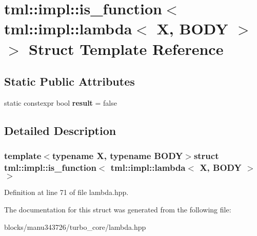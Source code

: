 \hypertarget{structtml_1_1impl_1_1is__function_3_01tml_1_1impl_1_1lambda_3_01_x_00_01_b_o_d_y_01_4_01_4}{\section{tml\+:\+:impl\+:\+:is\+\_\+function$<$ tml\+:\+:impl\+:\+:lambda$<$ X, B\+O\+D\+Y $>$ $>$ Struct Template Reference}
\label{structtml_1_1impl_1_1is__function_3_01tml_1_1impl_1_1lambda_3_01_x_00_01_b_o_d_y_01_4_01_4}
}
\subsection*{Static Public Attributes}
\begin{DoxyCompactItemize}
\item 
\hypertarget{structtml_1_1impl_1_1is__function_3_01tml_1_1impl_1_1lambda_3_01_x_00_01_b_o_d_y_01_4_01_4_a3dc51d025588a82821db03c2f9decdf8}{static constexpr bool {\bfseries result} = false}\label{structtml_1_1impl_1_1is__function_3_01tml_1_1impl_1_1lambda_3_01_x_00_01_b_o_d_y_01_4_01_4_a3dc51d025588a82821db03c2f9decdf8}

\end{DoxyCompactItemize}


\subsection{Detailed Description}
\subsubsection*{template$<$typename X, typename B\+O\+D\+Y$>$struct tml\+::impl\+::is\+\_\+function$<$ tml\+::impl\+::lambda$<$ X, B\+O\+D\+Y $>$ $>$}



Definition at line 71 of file lambda.\+hpp.



The documentation for this struct was generated from the following file\+:\begin{DoxyCompactItemize}
\item 
blocks/manu343726/turbo\+\_\+core/lambda.\+hpp\end{DoxyCompactItemize}
